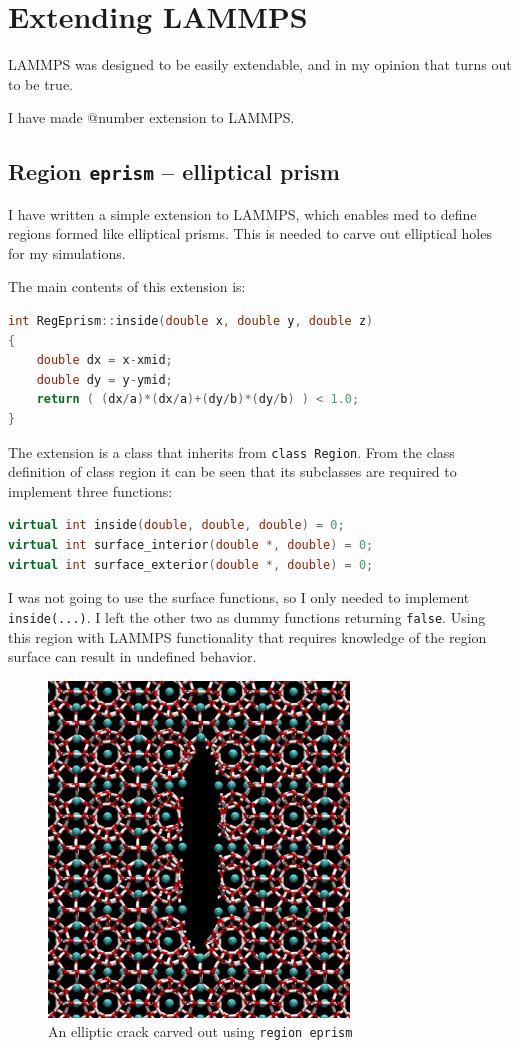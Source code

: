 \section{Extending LAMMPS}
LAMMPS was designed to be easily extendable, and in my opinion that turns out to be true.

I have made @number extension to LAMMPS.

\subsection{Region {\tt eprism} -- elliptical prism}
\label{subsec:reg_eprism}
I have written a simple extension to LAMMPS, which enables med to define regions formed like elliptical prisms. This is needed to carve out elliptical holes for my simulations. 

The main contents of this extension is:

\begin{lstlisting}[language=c++]
int RegEprism::inside(double x, double y, double z) 
{
	double dx = x-xmid;
	double dy = y-ymid;
	return ( (dx/a)*(dx/a)+(dy/b)*(dy/b) ) < 1.0;
}
\end{lstlisting}

The extension is a class that inherits from {\tt class Region}. 
From the class definition of class region it can be seen that its subclasses are required to implement three functions:

\begin{lstlisting}[language=c++]
virtual int inside(double, double, double) = 0;
virtual int surface_interior(double *, double) = 0;
virtual int surface_exterior(double *, double) = 0;
\end{lstlisting}

I was not going to use the surface functions, so I only needed to implement {\tt inside(...)}. I left the other two as dummy functions returning {\tt false}. Using this region with LAMMPS functionality that requires knowledge of the region surface can result in undefined behavior.

\begin{figure}
\centering
\includegraphics[width=8cm]{../snapshots/carved_crack.pdf}
\caption{An elliptic crack carved out using {\tt region eprism}}
\end{figure}

